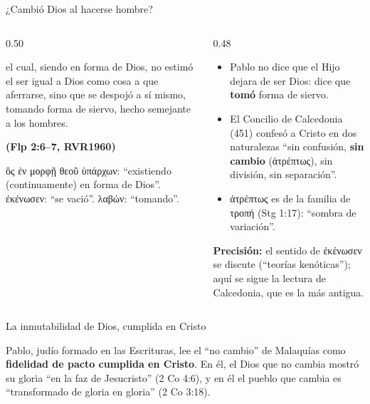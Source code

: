 \documentclass[hyperref={bookmarks=false},aspectratio=169]{beamer}
\newcommand{\grc}[1]{\foreignlanguage{ancientgreek}{#1}}
\newcommand{\fuente}[1]{\par\hfill{\upshape\bfseries\footnotesize\textcolor{azul}{#1}}}
\newcommand{\destacar}[1]{\textbf{\textcolor{azul}{#1}}}
\newcommand{\precision}[1]{{\footnotesize\color{gris}\textbf{Precisión:} #1}}
\begin{document}
\begin{frame}{¿Cambió Dios al hacerse hombre?}
\begin{columns}[t,onlytextwidth]
\begin{column}{0.50\textwidth}
\begin{cita}el cual, siendo en forma de Dios, no estimó el ser igual a Dios como cosa a que aferrarse, sino que se despojó a sí mismo, tomando forma de siervo, hecho semejante a los hombres.\fuente{(Flp 2:6--7, RVR1960)}\end{cita}
\scriptsize\grc{ὃς ἐν μορφῇ θεοῦ ὑπάρχων}: ``existiendo (continuamente) en forma de Dios''. \grc{ἐκένωσεν}: ``se vació''. \grc{λαβών}: ``tomando''.
\end{column}
\begin{column}{0.48\textwidth}\small
\begin{itemize}
\item Pablo no dice que el Hijo dejara de ser Dios: dice que \destacar{tomó} forma de siervo.
\item El Concilio de Calcedonia (451) confesó a Cristo en dos naturalezas ``sin confusión, \destacar{sin cambio} (\grc{ἀτρέπτως}), sin división, sin separación''.
\item \grc{ἀτρέπτως} es de la familia de \grc{τροπή} (Stg 1:17): ``sombra de variación''.
\end{itemize}
\precision{el sentido de \grc{ἐκένωσεν} se discute (``teorías kenóticas''); aquí se sigue la lectura de Calcedonia, que es la más antigua.}
\end{column}
\end{columns}
\end{frame}

\begin{frame}{La inmutabilidad de Dios, cumplida en Cristo}
\centering
{}\par\medskip
\small\RaggedRight Pablo, judío formado en las Escrituras, lee el ``no cambio'' de Malaquías como \destacar{fidelidad de pacto cumplida en Cristo}. En él, el Dios que no cambia mostró su gloria ``en la faz de Jesucristo'' (2 Co 4:6), y en él el pueblo que cambia es ``transformado de gloria en gloria'' (2 Co 3:18).
\end{frame}
\end{document}
